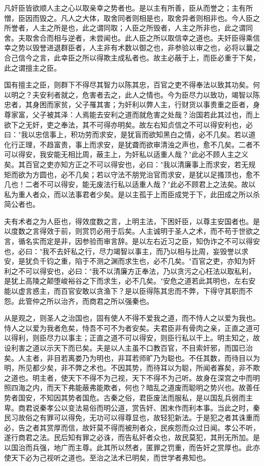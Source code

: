 \documentclass[]{article}
\begin{document}
凡奸臣皆欲顺人主之心以取亲幸之势者也。是以主有所善，臣从而誉之；主有所憎，臣因而毁之。凡人之大体，取舍同者则相是也，取舍异者则相非也。今人臣之所誉者，人主之所是也，此之谓同取；人臣之所毁者，人主之所非也，此之谓同舍。夫取舍合而相与逆者，未尝闻也。此人臣之所以取信幸之道也。夫奸臣得乘信幸之势以毁誉进退群臣者，人主非有术数以御之也，非参验以审之也，必将以曩之合己信今之言，此幸臣之所以得欺主成私者也。故主必蔽于上，而臣必重于下矣，此之谓擅主之臣。

国有擅主之臣，则群下不得尽其智力以陈其忠，百官之吏不得奉法以致其功矣。何以明之？夫安利者就之，危害者去之，此人之情也。今为臣尽力以致功，竭智以陈忠者，其身困而家贫，父子罹其害；为奸利以弊人主，行财货以事贵重之臣者，身尊家富，父子被其泽：人焉能去安利之道而就危害之处哉？治国若此其过也，而上欲下之无奸，吏之奉法，其不可得亦明矣。故左右知贞信之不可以得安利也，必曰："我以忠信事上，积功劳而求安，是犹盲而欲知黑白之情，必不几矣。若以道化行正理，不趋富贵，事上而求安，是犹聋而欲审清浊之声也，愈不几矣。二者不可以得安，我安能无相比周，蔽主上，为奸私以适重人哉？"此必不顾人主之义矣。其百官之吏亦知方正之不可以得安也，必曰："我以清廉事上而求安，若无规矩而欲为方圆也，必不几矣；若以守法不朋党治官而求安，是犹以足搔顶也，愈不几也！二者不可以得安，能无废法行私以适重人哉？"此必不顾君上之法矣。故以私为重人者众，而以法事君者少矣。是以主孤于上而臣成党于下，此田成之所以杀简公者也。

夫有术者之为人臣也，得效度数之言，上明主法，下困奸臣，以尊主安国者也。是以度数之言得效于前，则赏罚必用于后矣。人主诚明于圣人之术，而不苟于世欲之言，循名实而定是非，因参验而审言辞。是以左右近习之臣，知伪诈之不可以得安也，必曰："我不去奸私之行，尽力竭智以事主，而乃以相与比周，妄毁誉以求安，是犹负千钧之重，陷于不测之渊而求生也，必不几矣。"百官之吏，亦知为奸利之不可以得安也，必曰："我不以清廉方正奉法，乃以贪污之心枉法以取私利，是犹上高陵之颠堕峻裕谷之下而求生，必不几矣。"安危之道若此其明也，左右安能以虚言惑主，而百官安敢以贪渔下？是以臣得陈其忠而不弊，下得守其职而不怨。此管仲之所以治齐，而商君之所以强秦也。

从是观之，则圣人之治国也，固有使人不得不爱我之道，而不恃人之以爱为我也。恃人之以爱为我者危矣，恃吾不可不为者安矣。夫君臣非有骨肉之亲，正直之道可以得利，则臣尽力以事主；正直之道不可以得安，则臣行私以干上。明主知之，故设利害之道以示天下而已矣。夫是以人主虽不口教百官，不目索奸邪，而国已治矣。人主者，非目若离娄乃为明也，非耳若师旷乃为聪也。不任其数，而待目以为明，所见都少矣，非不弊之术也。不因其势，而待耳以为聪，所闻者寡矣，非不欺之道也。明主者，使天下不得不为己视，天下不得不为己听。故身在深宫之中而明照四海之内，而天下弗能蔽弗能欺者，何也？暗乱之道废而聪明之势兴也。故善任势者国安，不知因其势者国危。古秦之俗，君臣废法而服私，是以国乱兵弱而主卑。商君说秦孝公以变法易俗而明公道，赏告奸、困末作而利本事。当此之时，秦民习故俗之有罪可以得免，无功可以得尊显也，故轻犯新法。于是犯之者其诛重而必，告之者其赏厚而信，故奸莫不得而被刑者众，民疾怨而众过日闻。孝公不听，遂行商君之法。民后知有罪之必诛，而告私奸者众也，故民莫犯，其刑无所加。是以国治而兵强，地广而主尊。此其所以然者，匿罪之罚重，而告奸之赏厚也。此亦使天下必为己视听之道也。至治之法术已明矣，而世学者弗知也。
\end{document}
